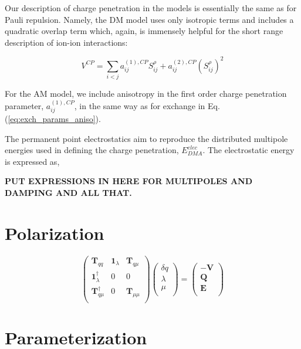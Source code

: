 \documentclass[journal=jacsat,manuscript=article]{achemso}
\begin{document}
Our description of charge penetration in the models is essentially
the same as for Pauli repulsion. Namely, the DM model uses only
isotropic terms and includes a quadratic overlap term which, again,
is immensely helpful for the short range description of ion-ion interactions:

\begin{equation}
  V^{CP} = \sum_{i<j}a_{ij}^{(1),CP}S_{ij}^\rho+a_{ij}^{(2),CP}(S_{ij}^\rho)^2
  \label{eq:exch_iso}
\end{equation}

For the AM model, we include anisotropy in the first order charge penetration
parameter, $a_{ij}^{(1),CP}$, in the same way as for exchange in Eq. (\ref{eq:exch_params_aniso}).

The permanent point electrostatics aim to reproduce the distributed
multipole energies used in defining the charge penetration, $E^{elec}_{DMA}$.
The electrostatic energy is expressed as,

\textbf{PUT EXPRESSIONS IN HERE FOR MULTIPOLES AND DAMPING AND ALL THAT.}

\section*{Polarization}

\begin{equation}
  \begin{pmatrix}
    \mathbf{T}_{qq} & \mathbf{1}_\lambda & \mathbf{T}_{q\mu} \\
    \mathbf{1}_\lambda^\dagger & 0 & 0 \\
    \mathbf{T}_{q\mu}^\dagger & 0 & \mathbf{T}_{\mu\mu} \\
  \end{pmatrix}
  \begin{pmatrix}
    \delta q \\
    \lambda \\
    \mu \\
  \end{pmatrix}
  =
  \begin{pmatrix}
    -\mathbf{V} \\
    \mathbf{Q} \\
    \mathbf{E} \\
  \end{pmatrix}
\end{equation}

\section{Parameterization}
\end{document}
